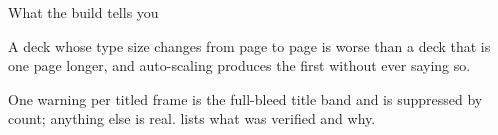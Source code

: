 \documentclass[aspectratio=169]{beamer}
\begin{document}
\begin{frame}{What the build tells you}


  {\small\setlength{\parskip}{0.6em}%
   A deck whose type size changes from page to
  page is worse than a deck that is one page longer, and auto-scaling produces
  the first without ever saying so. \lipsum[6][1-2]

   One warning per titled frame is the
  full-bleed title band and is suppressed by count; anything else is real.
   lists what was verified and why.\par}


\end{frame}
\end{document}
